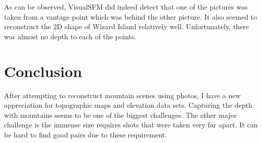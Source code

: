 \documentclass[11pt,psfig]{article}
\begin{document}
As can be observed, VisualSFM did indeed detect that one of the pictures was taken from a vantage point which was behind the other picture. It also seemed to reconstruct the 2D shape of Wizard Island relatively well. Unfortunately, there was almost no depth to each of the points. 


\section{Conclusion}

After attempting to reconstruct mountain scenes using photos, I have a new appreciation for topographic maps and elevation data sets. Capturing the depth with mountains seems to be one of the biggest challenges. The other major challenge is the immense size requires shots that were taken very far apart. It can be hard to find good pairs due to these requirement. 
\end{document}
